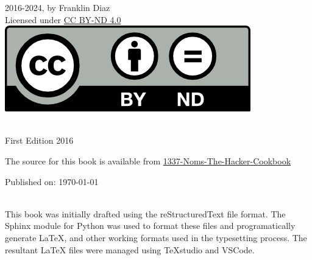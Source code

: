 \pagebreak
\justifying
\textcopyright{} 2016-2024, by Franklin Diaz
\vspace{5mm}\\

\justifying
Licensed under \href{https://creativecommons.org/licenses/by-nd/4.0/}{CC BY-ND 4.0} 
\faCreativeCommons\ \faCreativeCommonsBy\ \faCreativeCommonsSa\
\vspace{5mm}\\
\includegraphics{../images/by-nd.png}

\vspace{5mm}\\
First Edition 2016

\justifying
The source for this book is available from 
{\href{https://github.com/DEAD10C5/1337-Noms-The-Hacker-Cookbook}{1337-Noms-The-Hacker-Cookbook}}

\vspace{3mm}
Published on: \today

\vspace{5mm}\\
\justifying
This book was initially drafted using the reStructuredText file format.
The Sphinx module for Python was used to format these files and programatically
generate LaTeX, and other working formats used in the typesetting process. The
resultant LaTeX files were managed using TeXstudio and VSCode.

